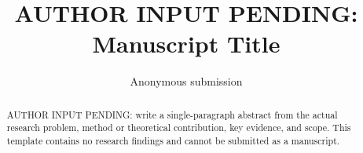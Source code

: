 \documentclass{article}\usepackage{ijcai26,times,graphicx,amsmath,amssymb,amsthm,booktabs,algorithm,algorithmic,url}
\title{AUTHOR INPUT PENDING: Manuscript Title}\author{Anonymous submission}
\begin{document}
\maketitle
\begin{abstract}
AUTHOR INPUT PENDING: write a single-paragraph abstract from the actual research problem,
method or theoretical contribution, key evidence, and scope. This template contains
no research findings and cannot be submitted as a manuscript.
\end{abstract}


\end{document}
